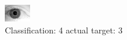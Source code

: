 \begin{figure}[h!]
\begin{center}
\includegraphics[width=0.60\columnwidth]{figures/ID2156_class_4_target_3.png}
\end{center}
\caption{ Classification: 4 actual target: 3}
\label{fig:ID2156_class_4_target_3}
\end{figure}
